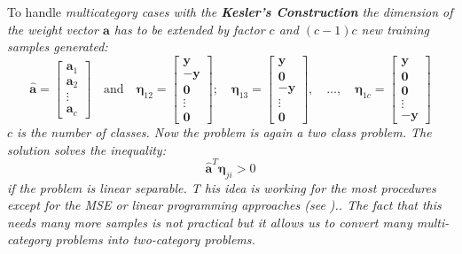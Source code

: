  	To handle \em multicategory cases \em with the \textbf{Kesler's Construction} the dimension of 
 	the weight vector $\bm a$ has to be extended by factor $c$
 	 and $(c-1)c$ new training samples generated:
 	$$ \bm{ \hat{a} }=\begin{bmatrix}
 	\bm a_1\\
 	\bm a_2\\
 	\vdots\\
 	\bm a_c
 	\end{bmatrix} \quad \text{and} \quad \bm \eta_{12}=\begin{bmatrix}
 	\bm y\\
 	-\bm y\\
 	\bm 0\\
 	\vdots\\
 	\bm 0
 	\end{bmatrix}; \quad \bm \eta_{13}=\begin{bmatrix}
 	\bm y\\
 	\bm 0\\
 	- \bm y\\
 	\vdots\\
 	\bm 0
 	\end{bmatrix}, \quad \ldots,\quad \bm \eta_{1c}=\begin{bmatrix}
 	\bm y\\
 	\bm 0\\
 	\bm 0\\
 	\vdots\\
 	-\bm y
 	\end{bmatrix}
 	$$
 	$c$ is the number of classes. Now the problem is again a two class problem. The solution solves the inequality:
 	$$\bm{\hat{a}}^T\bm \eta_{ji}>0$$
 	if the problem is linear separable. T
 	his idea is working for the most procedures except for the MSE or linear programming approaches (see )..
 	The fact that this needs many more samples is not practical but it allows us to convert many 
 	multi-category problems into two-category problems.
 	